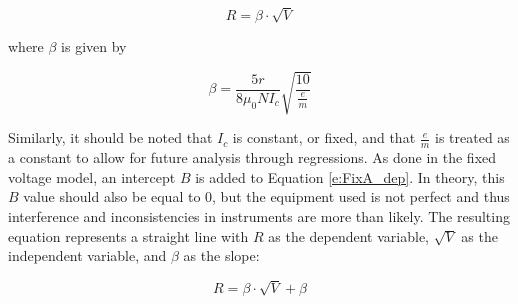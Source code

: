 \documentclass[12pt]{article}
\begin{document}
\begin{equation}
	R=\beta\cdot\sqrt{V} \label{e:FixA_dep}
\end{equation}

\noindent where $\beta$ is given by

\begin{equation}
	\beta=\frac{5r}{8\mu_0NI_c}\sqrt{\frac{10}{\frac{e}{m}}} \label{e:FixA_beta}
\end{equation}

\noindent Similarly, it should be noted that $I_c$ is constant, or fixed, and that $\frac{e}{m}$ is treated as a constant to allow for future analysis through regressions. As done in the fixed voltage model, an intercept $B$ is added to Equation \ref{e:FixA_dep}. In theory, this $B$ value should also be equal to 0, but the equipment used is not perfect and thus interference and inconsistencies in instruments are more than likely. The resulting equation represents a straight line with $R$ as the dependent variable, $\sqrt{V}$ as the independent variable, and $\beta$ as the slope:

\begin{equation}
	R=\beta\cdot\sqrt{V}+\beta \label{e:FixA_linear}
\end{equation}

\end{document}

